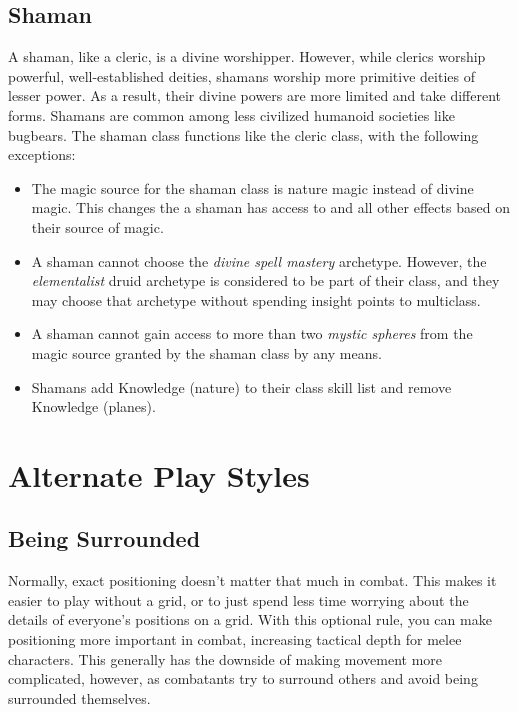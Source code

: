   \subsection{Shaman}
    A shaman, like a cleric, is a divine worshipper.
    However, while clerics worship powerful, well-established deities, shamans worship more primitive deities of lesser power.
    As a result, their divine powers are more limited and take different forms.
    Shamans are common among less civilized humanoid societies like bugbears.
    The shaman class functions like the cleric class, with the following exceptions:
    \begin{itemize}
      \item The magic source for the shaman class is nature magic instead of divine magic.
        This changes the  a shaman has access to and all other effects based on their source of magic.
      \item A shaman cannot choose the \textit{divine spell mastery} archetype. However, the \textit{elementalist} druid archetype is considered to be part of their class, and they may choose that archetype without spending insight points to multiclass.
      \item A shaman cannot gain access to more than two \textit{mystic spheres} from the magic source granted by the shaman class by any means.
      \item Shamans add Knowledge (nature) to their class skill list and remove Knowledge (planes).
    \end{itemize}

\section{Alternate Play Styles}

  \subsection{Being Surrounded}\label{Being Surrounded}
    Normally, exact positioning doesn't matter that much in combat.
    This makes it easier to play without a grid, or to just spend less time worrying about the details of everyone's positions on a grid.
    With this optional rule, you can make positioning more important in combat, increasing tactical depth for melee characters.
    This generally has the downside of making movement more complicated, however, as combatants try to surround others and avoid being surrounded themselves.

